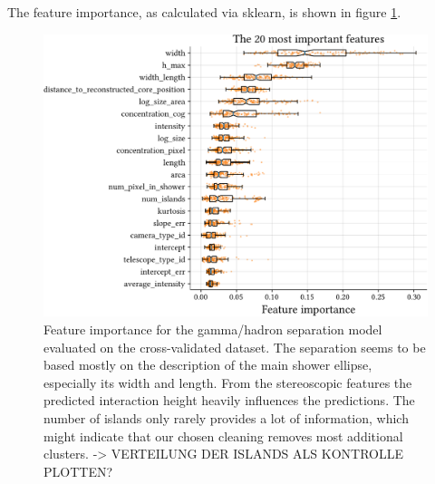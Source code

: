 The feature importance, as calculated via sklearn, is shown in figure \ref{fig:gh_features}.
\begin{figure}
    \centering
    \captionsetup{width=0.9\linewidth}
    \hspace*{-0.15\textwidth}\includegraphics[page=1, width=.9\textwidth]{../analysis/plots/separation_features.pdf}
    \caption{Feature importance for the gamma/hadron separation model evaluated on the cross-validated dataset.
    The separation seems to be based mostly on the description of the main shower ellipse, especially its width and length.
    From the stereoscopic features the predicted interaction height heavily influences the predictions.
    The number of islands only rarely provides a lot of information, which might indicate that our chosen cleaning 
    removes most additional clusters. -> VERTEILUNG DER ISLANDS ALS KONTROLLE PLOTTEN?}
    \label{fig:gh_features}
\end{figure}
